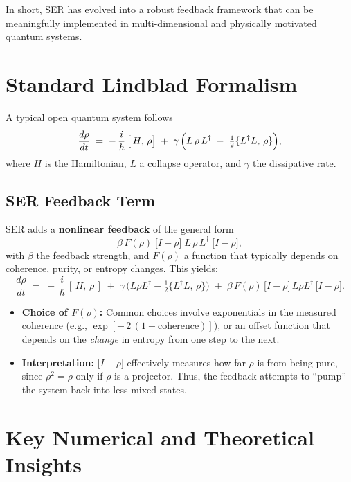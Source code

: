 \documentclass{article}
\begin{document}
In short, SER has evolved into a robust feedback framework that can be meaningfully implemented in multi-dimensional and physically motivated quantum systems.

\section{Standard Lindblad Formalism}
A typical open quantum system follows
\begin{equation}
\frac{d\rho}{dt} \;=\; -\,\frac{i}{\hbar}\,\bigl[\,H,\,\rho\bigr]
\;+\;
\gamma\,\Bigl(L\,\rho\,L^\dagger \;-\;\tfrac12\{L^\dagger L,\,\rho\}\Bigr),
\end{equation}
where $H$ is the Hamiltonian, $L$ a collapse operator, and $\gamma$ the dissipative rate.

\subsection{SER Feedback Term}
SER adds a \textbf{nonlinear feedback} of the general form
\[
\beta\,F(\rho)\;\bigl[I - \rho\bigr]\;L\,\rho\,L^\dagger\;\bigl[I - \rho\bigr],
\]
with $\beta$ the feedback strength, and $F(\rho)$ a function that typically depends on coherence, purity, or entropy changes. This yields:
\begin{equation}
\frac{d\rho}{dt}
\;=\;
-\,\frac{i}{\hbar}\,[\,H,\,\rho\,]
\;+\;
\gamma\,\bigl(L\rho L^\dagger - \tfrac12\{L^\dagger L,\,\rho\}\bigr)
\;+\;
\beta\,F(\rho)\,\bigl[I - \rho\bigr]\,L\rho L^\dagger\,\bigl[I - \rho\bigr].
\end{equation}

\begin{itemize}
\item \textbf{Choice of $F(\rho)$:}
Common choices involve exponentials in the measured coherence (e.g., $\exp[-\,2\,(1-\text{coherence})]$), or an offset function that depends on the \emph{change} in entropy from one step to the next.

\item \textbf{Interpretation:}
$\bigl[I - \rho\bigr]$ effectively measures how far $\rho$ is from being pure, since $\rho^2 = \rho$ only if $\rho$ is a projector. Thus, the feedback attempts to ``pump'' the system back into less-mixed states.
\end{itemize}

\section{Key Numerical and Theoretical Insights}
\end{document}
